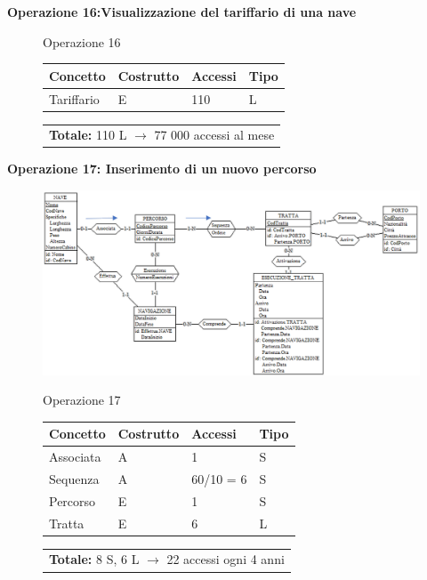 \documentclass[a4paper, titlepage]{report}
\begin{document}
	\noindent
	\textbf{{\large{Operazione 16:}}}\textbf{Visualizzazione del tariffario di una nave}
	\vspace{0.5cm}
	\begin{figure}[h]
		\centering
		Operazione 16 \\
		\begin{tabular}{L{3cm}C{2.5cm}C{4.5cm}C{2.5cm}}
			\rule[-2mm]{0mm}{0.65cm}{}
			\textbf{Concetto} & \textbf{Costrutto} &\textbf{Accessi} & \textbf{Tipo} \\
			\hline\rule[-2mm]{0mm}{0.65cm}{}
			Tariffario & E & 110 & L \\
		\end{tabular}
		
		\begin{tabular}{C{13.9cm}}
			\rule[-4mm]{0mm}{1cm}{}	
			 \textbf{Totale:} 110 L $\to$ 77 000 accessi al mese
		\end{tabular}
	\end{figure}
	
	
	\noindent
	\textbf{{\large {Operazione 17: }}}\textbf{Inserimento di un nuovo percorso}
	  \vspace{0.5cm}
	\begin{figure}[h]
		\centering
		\includegraphics[scale=0.7]{images/SchNav02.png}		
	\end{figure}
	\vspace{0.5cm}
	\begin{figure}[h]
		\centering
		Operazione 17\\
		\begin{tabular}{L{3cm}C{2.5cm}C{4.5cm}C{2.5cm}}
			\rule[-2mm]{0mm}{0.65cm}{}
			\textbf{Concetto} & \textbf{Costrutto} &\textbf{Accessi} & \textbf{Tipo} \\
			\hline\rule[-2mm]{0mm}{0.65cm}{}
			Associata & A & 1 & S \\
			\hline\rule[-2mm]{0mm}{0.65cm}{}
			Sequenza & A & 60/10 = 6 & S \\
			\hline\rule[-2mm]{0mm}{0.65cm}{}
			Percorso & E & 1 & S \\
			\hline\rule[-2mm]{0mm}{0.65cm}{}
			Tratta & E & 6 & L \\
		\end{tabular}
		\begin{tabular}{C{13.9cm}}
			\rule[-4mm]{0mm}{1cm}{}	
			 \textbf{Totale:} 8 S, 6 L $\to$ 22 accessi ogni 4 anni
		\end{tabular}
	\end{figure}
	
\end{document}
